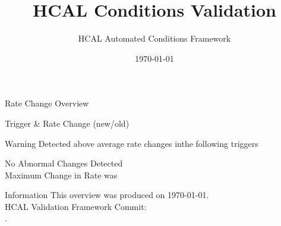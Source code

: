 \documentclass{beamer}
\title{HCAL Conditions Validation}
\author{HCAL Automated Conditions Framework}
\institute{CERN}
\date{\today}
\begin{document}
\frame{\titlepage}



\begin{frame}{Rate Change Overview}

\begin{center}
        Trigger & Rate Change (new/old) \\ \hline
          

    \begin{alertblock}{Warning}
        \large Detected above average rate changes inthe following triggers\\
         
    \end{alertblock}
    \centering
    \Large No Abnormal Changes Detected \\
    Maximum Change in Rate was 
\end{center}

\end{frame}



\begin{frame}{Information}
    This overview was produced on \today.\\
    HCAL Validation Framework Commit: \\
    .
\end{frame}
\end{document}

